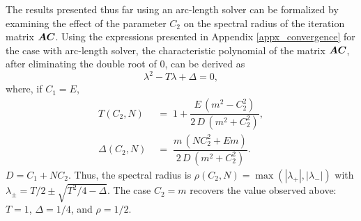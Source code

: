 \documentclass[10pt]{cas-sc}
\newcommand{\deleted}[1]{}
\newcommand{\added}[1]{#1}
\begin{document}

\added{The results presented thus far using an arc-length solver can be formalized by examining the effect of the parameter $C_2$ on the spectral radius of the iteration matrix $\mbox{\boldmath $A$} \mbox{\boldmath $C$}$.} Using the expressions presented in Appendix \ref{appx_convergence} for the case with arc-length solver, the characteristic polynomial of the matrix $\mbox{\boldmath $A$} \mbox{\boldmath $C$}$, after eliminating the double root of $0$, can be derived as
\begin{equation}
	\lambda^2 -T \lambda +\Delta =0,
\end{equation}
where, if $C_1=E$,
\begin{align}
	T(C_2,N) &\;=\; 1 + \dfrac{E\,(m^2 - C_2^2)}{2\,D\,(m^2+C_2^2)}, \label{eq:T}\\[4pt]
	\Delta(C_2,N) &\;=\; \dfrac{m\,(N C_2^2 + E m)}{2\,D\,(m^2+C_2^2)}. \label{eq:Delta}
\end{align}
$D=C_1+NC_2$. Thus, the spectral radius is $\rho(C_2,N) = \max(|\lambda_+|,|\lambda_-|)$ with $\lambda_\pm = T/2 \pm \sqrt{T^2/4 - \Delta}$. \added{The case $C_2=m$ recovers the value observed above: $T=1$, $\Delta=1/4$, and $\rho=1/2$.}\deleted{When $C_2=m$, $T=1, \Delta=1/4$. $\lambda=0.5$, as stated earlier.}
\end{document}
